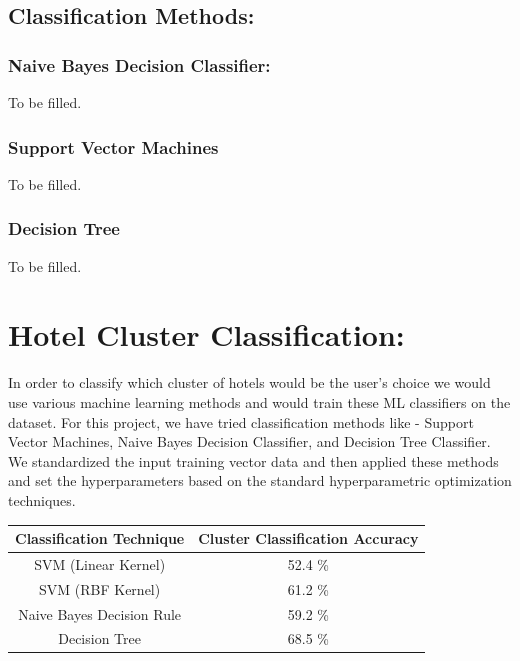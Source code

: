 \documentclass[conference]{IEEEtran}
\begin{document}
\subsection{Classification Methods:}

\subsubsection{Naive Bayes Decision Classifier:}
To be filled.

\subsubsection{Support Vector Machines}
To be filled.

\subsubsection{Decision Tree}
To be filled.

\section{\textbf{Hotel Cluster Classification:}}
In order to classify which cluster of hotels would be the user's choice we would use various machine learning methods and would train these ML classifiers on the dataset. For this project, we have tried classification methods like - Support Vector Machines, Naive Bayes Decision Classifier, and Decision Tree Classifier. \\
We standardized the input training vector data and then applied these methods and set the hyperparameters based on the standard hyperparametric optimization techniques.\cite{9257290}

\begin{table}[htbp]
\begin{tabular}{|c|c|}
\hline
\textbf{Classification Technique} & \textbf{Cluster Classification Accuracy} \\ \hline
SVM (Linear Kernel)               & 52.4 \%                                  \\ \hline
SVM (RBF Kernel)                  & 61.2 \%                                  \\ \hline
Naive Bayes Decision Rule         & 59.2 \%                                  \\ \hline
Decision Tree                     & 68.5 \%                                    \\ \hline
\end{tabular}
\end{table}
\end{document}
